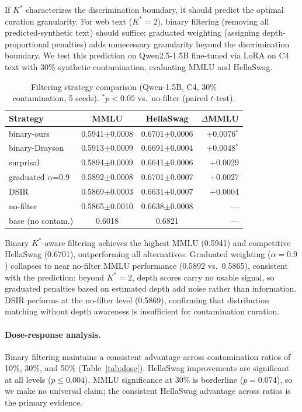 \documentclass[11pt,a4paper]{article}
\begin{document}
If $K^*$ characterizes the discrimination boundary, it should predict the optimal curation granularity. For web text ($K^*\!=\!2$), binary filtering (removing all predicted-synthetic text) should suffice; graduated weighting (assigning depth-proportional penalties) adds unnecessary granularity beyond the discrimination boundary. We test this prediction on Qwen2.5-1.5B fine-tuned via LoRA on C4 text with 30\% synthetic contamination, evaluating MMLU and HellaSwag.

\begin{table}[t]
\centering
\small
\caption{Filtering strategy comparison (Qwen-1.5B, C4, 30\% contamination, 5 seeds). $^*p < 0.05$ vs.\ no-filter (paired $t$-test).}
\label{tab:filtering}
\begin{tabular}{lccr}
\toprule
Strategy & MMLU & HellaSwag & $\Delta$MMLU \\
\midrule
binary-ours          & 0.5941$\pm$0.0008 & 0.6701$\pm$0.0006 & $+$0.0076$^*$ \\
binary-Drayson       & 0.5913$\pm$0.0009 & 0.6691$\pm$0.0004 & $+$0.0048$^*$ \\
surprisal            & 0.5894$\pm$0.0009 & 0.6641$\pm$0.0006 & $+$0.0029 \\
graduated $\alpha$=0.9 & 0.5892$\pm$0.0008 & 0.6701$\pm$0.0007 & $+$0.0027 \\
DSIR                 & 0.5869$\pm$0.0003 & 0.6631$\pm$0.0007 & $+$0.0004 \\
no-filter            & 0.5865$\pm$0.0010 & 0.6638$\pm$0.0008 &   ---   \\
\midrule
base (no contam.)    & 0.6018 & 0.6821 &   ---   \\
\bottomrule
\end{tabular}
\end{table}

Binary $K^*$-aware filtering achieves the highest MMLU (0.5941) and competitive HellaSwag (0.6701), outperforming all alternatives. Graduated weighting ($\alpha\!=\!0.9$) collapses to near no-filter MMLU performance (0.5892 vs.\ 0.5865), consistent with the prediction: beyond $K^*\!=\!2$, depth scores carry no usable signal, so graduated penalties based on estimated depth add noise rather than information. DSIR performs at the no-filter level (0.5869), confirming that distribution matching without depth awareness is insufficient for contamination curation.

\paragraph{Dose-response analysis.} Binary filtering maintains a consistent advantage across contamination ratios of 10\%, 30\%, and 50\% (Table~\ref{tab:dose}). HellaSwag improvements are significant at all levels ($p \leq 0.004$). MMLU significance at 30\% is borderline ($p = 0.074$), so we make no universal claim; the consistent HellaSwag advantage across ratios is the primary evidence.
\end{document}
